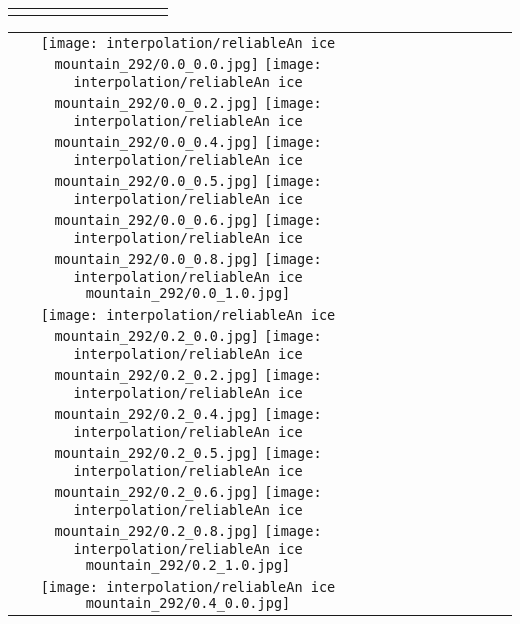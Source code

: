 \documentclass[10pt,twocolumn,letterpaper]{article}
\begin{document}
\begin{figure*}[tb!]
{\begin{tabular}{c c c c c c c c c c}
  \tabularnewline
\vspace{2mm}
\vspace{-2\baselineskip}
\end{tabular}}
\vspace{-0.8cm}
\hspace{20pt}
\label{fig:glideablation12}
\vspace{-2mm}
\end{figure*} \begin{figure*}[tb!]
    \centering
    \setlength{\tabcolsep}{0.5pt}
    {\small
    \renewcommand{\arraystretch}{0.5} 
    \begin{tabular}{c c c c c c c c c c}
    \captionsetup{type=figure, font=scriptsize}
    \raisebox{0.1in}{\rotatebox{90}{\small \emph{}
 }}
  \texttt{[image: interpolation/reliableAn ice mountain\_292/0.0\_0.0.jpg]}
  \texttt{[image: interpolation/reliableAn ice mountain\_292/0.0\_0.2.jpg]}
  \texttt{[image: interpolation/reliableAn ice mountain\_292/0.0\_0.4.jpg]}
  \texttt{[image: interpolation/reliableAn ice mountain\_292/0.0\_0.5.jpg]}
  \texttt{[image: interpolation/reliableAn ice mountain\_292/0.0\_0.6.jpg]}
  \texttt{[image: interpolation/reliableAn ice mountain\_292/0.0\_0.8.jpg]}
  \texttt{[image: interpolation/reliableAn ice mountain\_292/0.0\_1.0.jpg]}
 \tabularnewline
     \raisebox{0.1in}{\rotatebox{90}{\small \emph{}
 }}
  \texttt{[image: interpolation/reliableAn ice mountain\_292/0.2\_0.0.jpg]}
  \texttt{[image: interpolation/reliableAn ice mountain\_292/0.2\_0.2.jpg]}
  \texttt{[image: interpolation/reliableAn ice mountain\_292/0.2\_0.4.jpg]}
  \texttt{[image: interpolation/reliableAn ice mountain\_292/0.2\_0.5.jpg]}
  \texttt{[image: interpolation/reliableAn ice mountain\_292/0.2\_0.6.jpg]}
  \texttt{[image: interpolation/reliableAn ice mountain\_292/0.2\_0.8.jpg]}
  \texttt{[image: interpolation/reliableAn ice mountain\_292/0.2\_1.0.jpg]}
\tabularnewline
    \raisebox{0.1in}{\rotatebox{90}{\small \emph{}
 }}
  \texttt{[image: interpolation/reliableAn ice mountain\_292/0.4\_0.0.jpg]}

\end{tabular}}
\end{figure*}
\end{document}

